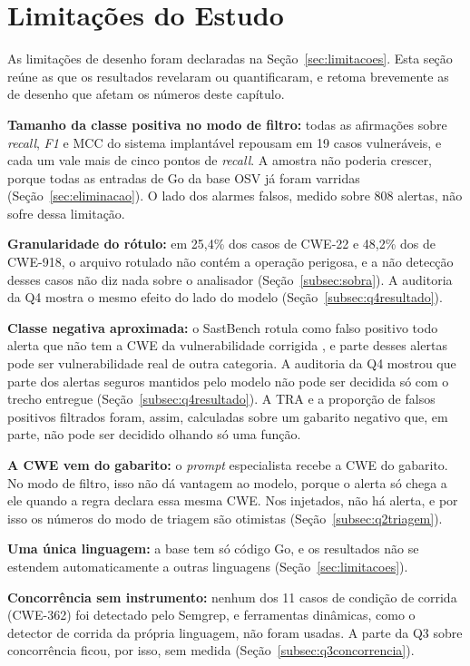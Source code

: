 \section{Limitações do Estudo}
\label{sec:limitacoesresultados}

As limitações de desenho foram declaradas na Seção~\ref{sec:limitacoes}. Esta seção reúne as que os resultados revelaram ou quantificaram, e retoma brevemente as de desenho que afetam os números deste capítulo.

\textbf{Tamanho da classe positiva no modo de filtro:} todas as afirmações sobre \textit{recall}, \textit{F1} e MCC do sistema implantável repousam em 19 casos vulneráveis, e cada um vale mais de cinco pontos de \textit{recall}. A amostra não poderia crescer, porque todas as entradas de Go da base OSV já foram varridas (Seção~\ref{sec:eliminacao}). O lado dos alarmes falsos, medido sobre 808 alertas, não sofre dessa limitação.

\textbf{Granularidade do rótulo:} em 25,4\% dos casos de CWE-22 e 48,2\% dos de CWE-918, o arquivo rotulado não contém a operação perigosa, e a não detecção desses casos não diz nada sobre o analisador (Seção~\ref{subsec:sobra}). A auditoria da Q4 mostra o mesmo efeito do lado do modelo (Seção~\ref{subsec:q4resultado}).

\textbf{Classe negativa aproximada:} o SastBench rotula como falso positivo todo alerta que não tem a CWE da vulnerabilidade corrigida \cite{feiglin2026sastbench}, e parte desses alertas pode ser vulnerabilidade real de outra categoria. A auditoria da Q4 mostrou que parte dos alertas seguros mantidos pelo modelo não pode ser decidida só com o trecho entregue (Seção~\ref{subsec:q4resultado}). A TRA e a proporção de falsos positivos filtrados foram, assim, calculadas sobre um gabarito negativo que, em parte, não pode ser decidido olhando só uma função.

\textbf{A CWE vem do gabarito:} o \textit{prompt} especialista recebe a CWE do gabarito. No modo de filtro, isso não dá vantagem ao modelo, porque o alerta só chega a ele quando a regra declara essa mesma CWE. Nos injetados, não há alerta, e por isso os números do modo de triagem são otimistas (Seção~\ref{subsec:q2triagem}).

\textbf{Uma única linguagem:} a base tem só código Go, e os resultados não se estendem automaticamente a outras linguagens (Seção~\ref{sec:limitacoes}).

\textbf{Concorrência sem instrumento:} nenhum dos 11 casos de condição de corrida (CWE-362) foi detectado pelo Semgrep, e ferramentas dinâmicas, como o detector de corrida da própria linguagem, não foram usadas. A parte da Q3 sobre concorrência ficou, por isso, sem medida (Seção~\ref{subsec:q3concorrencia}).

